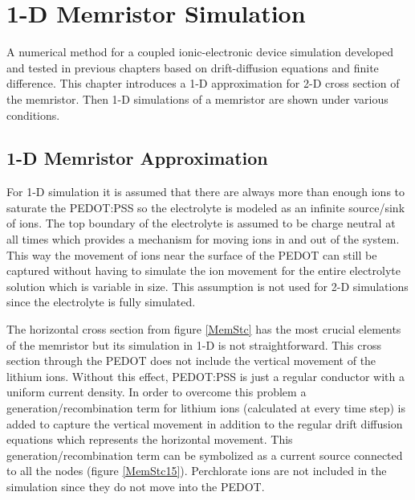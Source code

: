 \chapter{1-D Memristor Simulation} %

\label{Chapter6} %


\begin{doublespace}

A numerical method for a coupled ionic-electronic device simulation  developed and tested in previous chapters based on drift-diffusion equations and finite difference. This chapter introduces a 1-D approximation for  2-D cross section of the memristor. Then 1-D simulations of a memristor are shown under various conditions.


\section{1-D Memristor Approximation}

For  1-D simulation it is assumed that there are always more than enough ions to saturate the PEDOT:PSS so the electrolyte is modeled as an infinite source/sink of ions. The top boundary of the electrolyte is assumed to be charge neutral at all times which provides a mechanism for moving ions in and out of the system. This way the movement of ions near the surface of the PEDOT can still be captured without having to simulate the ion movement for the entire electrolyte solution which is variable in size. This assumption is not used for 2-D simulations since the electrolyte is fully simulated.
 
The horizontal cross section from figure \ref{MemStc} has the most crucial elements of the memristor but its simulation in 1-D is not straightforward. This cross section through the PEDOT does not include the vertical movement of the lithium ions. Without this effect, PEDOT:PSS is just a regular conductor with a uniform current density. In order to overcome this problem a generation/recombination term for lithium ions (calculated at every time step) is added to capture the vertical movement in addition to the regular drift diffusion equations which represents the horizontal movement. This generation/recombination term can be symbolized as a current source connected to all the nodes (figure \ref{MemStc15}). Perchlorate ions are not included in the simulation since they do not move into the PEDOT.


\end{doublespace}
